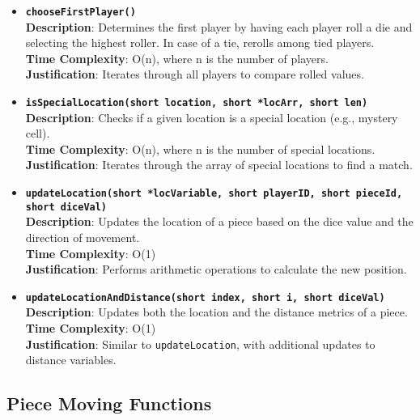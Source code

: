 \documentclass{article}
\begin{document}
        \begin{itemize}
            \item \textbf{\texttt{chooseFirstPlayer()}}\\
            \textbf{Description}: Determines the first player by having each player roll a die and selecting the highest roller. In case of a tie, rerolls among tied players.\\
            \textbf{Time Complexity}: O(n), where n is the number of players.\\
            \textbf{Justification}: Iterates through all players to compare rolled values.
            
            \item \textbf{\texttt{isSpecialLocation(short location, short *locArr, short len)}}\\
            \textbf{Description}: Checks if a given location is a special location (e.g., mystery cell).\\
            \textbf{Time Complexity}: O(n), where n is the number of special locations.\\
            \textbf{Justification}: Iterates through the array of special locations to find a match.
            
            \item \textbf{\texttt{updateLocation(short *locVariable, short playerID, short pieceId, short diceVal)}}\\
            \textbf{Description}: Updates the location of a piece based on the dice value and the direction of movement.\\
            \textbf{Time Complexity}: O(1)\\
            \textbf{Justification}: Performs arithmetic operations to calculate the new position.
            
            \item \textbf{\texttt{updateLocationAndDistance(short index, short i, short diceVal)}}\\
            \textbf{Description}: Updates both the location and the distance metrics of a piece.\\
            \textbf{Time Complexity}: O(1)\\
            \textbf{Justification}: Similar to \texttt{updateLocation}, with additional updates to distance variables.
        \end{itemize}
        
        \subsection{Piece Moving Functions}
        
\end{document}
